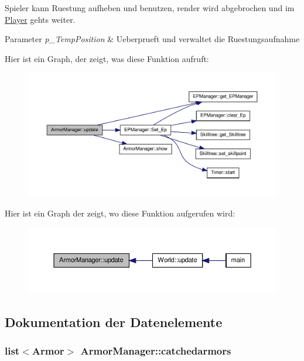 Spieler kann Ruestung aufheben und benutzen, render wird abgebrochen und im \hyperlink{class_player}{Player} gehts weiter. 


\begin{DoxyParams}{Parameter}
{\em p\-\_\-\-Temp\-Position} & Ueberprueft und verwaltet die Ruestungsaufnahme \\
\hline
\end{DoxyParams}


Hier ist ein Graph, der zeigt, was diese Funktion aufruft\-:\nopagebreak
\begin{figure}[H]
\begin{center}
\leavevmode
\includegraphics[width=350pt]{class_armor_manager_a6f608963c4a1efb31b2d658ee5246459_cgraph}
\end{center}
\end{figure}




Hier ist ein Graph der zeigt, wo diese Funktion aufgerufen wird\-:\nopagebreak
\begin{figure}[H]
\begin{center}
\leavevmode
\includegraphics[width=350pt]{class_armor_manager_a6f608963c4a1efb31b2d658ee5246459_icgraph}
\end{center}
\end{figure}




\subsection{Dokumentation der Datenelemente}
\hypertarget{class_armor_manager_a9990b68ff8338a1cc83b74c2fdeb793a}{
\subsubsection[{catchedarmors}]{\setlength{\rightskip}{0pt plus 5cm}list$<${\bf Armor}$>$ Armor\-Manager\-::catchedarmors\hspace{0.3cm}{\ttfamily [private]}}}\label{class_armor_manager_a9990b68ff8338a1cc83b74c2fdeb793a}


